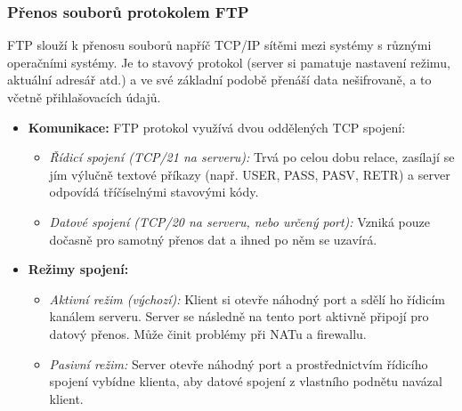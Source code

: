     \subsubsection{Přenos souborů protokolem FTP}
        FTP slouží k přenosu souborů napříč TCP/IP sítěmi mezi systémy s různými operačními systémy. Je to stavový protokol (server si pamatuje nastavení režimu, aktuální adresář atd.) a ve své základní podobě přenáší data nešifrovaně, a to včetně přihlašovacích údajů.
        \begin{itemize}
            \item \textbf{Komunikace:} FTP protokol využívá dvou oddělených TCP spojení:
            \begin{itemize}
                \item \textit{Řídicí spojení (TCP/21 na serveru):} Trvá po celou dobu relace, zasílají se jím výlučně textové příkazy (např. USER, PASS, PASV, RETR) a server odpovídá tříčíselnými stavovými kódy.
                \item \textit{Datové spojení (TCP/20 na serveru, nebo určený port):} Vzniká pouze dočasně pro samotný přenos dat a ihned po něm se uzavírá.
            \end{itemize}
            \item \textbf{Režimy spojení:}
            \begin{itemize}
                \item \textit{Aktivní režim (výchozí):} Klient si otevře náhodný port a sdělí ho řídicím kanálem serveru. Server se následně na tento port aktivně připojí pro datový přenos. Může činit problémy při NATu a firewallu.
                \item \textit{Pasivní režim:} Server otevře náhodný port a prostřednictvím řídicího spojení vybídne klienta, aby datové spojení z vlastního podnětu navázal klient.
            \end{itemize}
        \end{itemize}
